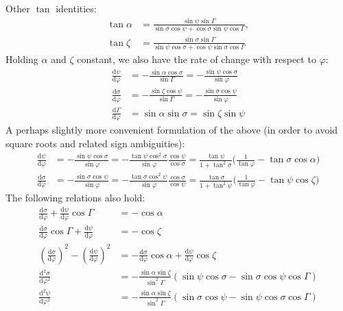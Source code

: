 \documentclass{book}
\newcommand{\phase}{\varphi}
\newcommand{\deriv}[2]{\frac{\text{d}{#1}}{\text{d}{#2}}}
\newcommand{\derivn}[3]{\frac{\text{d}^{#3}{#1}}{\text{d}{#2}^{#3}}}
\begin{document}
Other $\tan$ identities:
\begin{equation}
    \begin{aligned}
        \tan\alpha &= \frac{\sin\psi \sin\Gamma}{\sin\sigma \cos\psi + \cos\sigma \sin\psi \cos\Gamma}, \\[5pt]
        \tan\zeta  &= \frac{\sin\sigma \sin\Gamma}{\sin\psi \cos\sigma + \cos\psi \sin\sigma \cos\Gamma}
    \end{aligned}
\end{equation}
Holding $\alpha$ and $\zeta$ constant, we also have the rate of change with respect to $\phase$:
\begin{equation}
    \begin{aligned}
        \deriv{\psi}{\phase}
            &= -\frac{\sin\alpha \cos\sigma}{\sin\Gamma}
             = -\frac{\sin\psi \cos\sigma}{\sin\phase} \\[5pt]
        \deriv{\sigma}{\phase}
            &= -\frac{\sin\zeta \cos\psi}{\sin\Gamma}
             = -\frac{\sin\sigma \cos\psi}{\sin\phase} \\[5pt]
        \deriv{\Gamma}{\phase}
            &= \sin\alpha \sin\sigma
             = \sin\zeta  \sin\psi
    \end{aligned}
\end{equation}
A perhaps slightly more convenient formulation of the above (in order to avoid square roots and related sign ambiguities):
\begin{equation}
    \begin{aligned}
        \deriv{\psi}{\phase}
            &= -\frac{\sin\psi\cos\sigma}{\sin\phase}
             = -\frac{\tan\psi\cos^2\sigma}{\sin\phase}\frac{\cos\psi}{\cos\sigma}
             = \frac{\tan\psi}{1 + \tan^2\sigma}\bigg(\frac{1}{\tan\phase} - \tan\sigma\cos\alpha\bigg) \\
        \deriv{\sigma}{\phase}
            &= -\frac{\sin\sigma\cos\psi}{\sin\phase}
             = -\frac{\tan\sigma\cos^2\psi}{\sin\phase}\frac{\cos\sigma}{\cos\psi}
             = \frac{\tan\sigma}{1 + \tan^2\psi}\bigg(\frac{1}{\tan\phase} - \tan\psi\cos\zeta\bigg)
    \end{aligned}
\end{equation}
The following relations also hold:
\begin{equation}
    \begin{aligned}
        \deriv{\sigma}{\phase} + \deriv{\psi}{\phase}\cos\Gamma &= -\cos\alpha \\[5pt]
        \deriv{\sigma}{\phase}\cos\Gamma + \deriv{\psi}{\phase} &= -\cos\zeta \\[5pt]
        \left(\deriv{\sigma}{\phase}\right)^2 - \left(\deriv{\psi}{\phase}\right)^2
            &= -\deriv{\sigma}{\phase}\cos\alpha + \deriv{\psi}{\phase}\cos\zeta \\[5pt]
        \derivn{\sigma}{\phase}{2} &= -\frac{\sin\alpha\sin\zeta}{\sin^2\Gamma}(\sin\psi\cos\sigma - \sin\sigma\cos\psi\cos\Gamma)\\[5pt]
        \derivn{\psi}{\phase}{2} &= -\frac{\sin\alpha\sin\zeta}{\sin^2\Gamma}(\sin\sigma\cos\psi - \sin\psi\cos\sigma\cos\Gamma)
    \end{aligned}
\end{equation}
\end{document}

